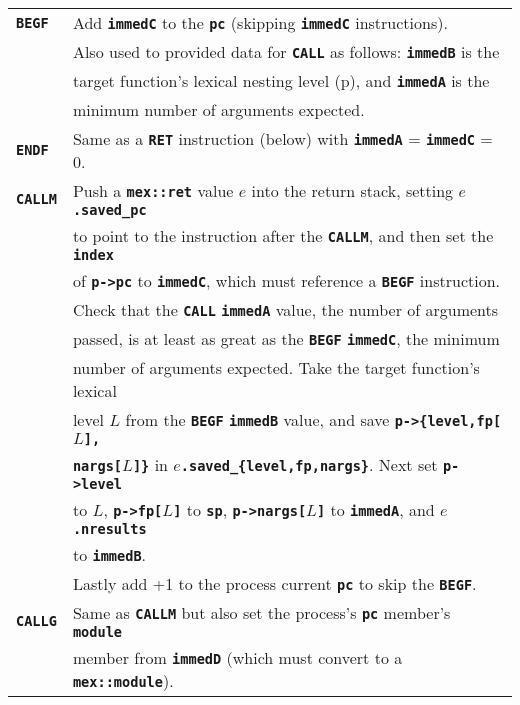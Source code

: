 \documentclass[12pt]{article}
\newcommand{\TT}[1]{{\tt \bfseries #1}}
\newcommand{\pagref}[1]{p\pageref{#1}}
\newlength{\figurewidth}
\newenvironment{boxedfigure}[1][!btp]%
	{\begin{figure*}[#1]
	 \begin{lrbox}{\figurebox}
	 \begin{minipage}{\figurewidth}

	 \vspace*{1ex}}%
	{
	 \vspace*{1ex}

	 \end{minipage}
	 \end{lrbox}

	 \centering
	 \fbox{\hspace*{0.1in}\usebox{\figurebox}\hspace*{0.1in}}
	 \end{figure*}}
\begin{document}
\pagebreak

\begin{boxedfigure}

\begin{center}
\begin{tabular}{|l|l|}
\hline
\TT{BEGF}
    & Add \TT{immedC} to the \TT{pc} (skipping \TT{immedC} instructions).
    \\[0.5ex]
    & Also used to provided data for \TT{CALL} as follows: \TT{immedB} is the \\
    & target function's lexical nesting level (\pagref{LEXICAL-NESTING-LEVEL}),
      and \TT{immedA} is the \\
    & minimum number of arguments expected.
\\\hline
\TT{ENDF}
    & Same as a \TT{RET} instruction (below) with
      \TT{immedA} = \TT{immedC} = 0. 
\\\hline
\TT{CALLM}
    & Push a \TT{mex::ret} value $e$ into the return stack, setting
      \TT{$e$.saved\_pc} \\
    & to point to the instruction after the \TT{CALLM}, and then
      set the \TT{index} \\
    & of \TT{p->pc} to \TT{immedC}, which must reference a
      \TT{BEGF} instruction.
    \\[0.5ex]
    & Check that the \TT{CALL} \TT{immedA} value, the number of arguments \\
    & passed, is at least as great as the \TT{BEGF}
      \TT{immedC}, the minimum \\
    & number of arguments expected.  Take the target 
      function's lexical \\
    & level $L$ from the \TT{BEGF} \TT{immedB} value, and save
      \TT{p->\{level,fp[$L$],} \\
    & \TT{nargs[$L$]\}} in \TT{$e$.saved\_\{level,fp,nargs\}}.
       Next set \TT{p->level} \\
    & to $L$, \TT{p->fp[$L$]} to \TT{sp}, \TT{p->nargs[$L$]} to \TT{immedA},
      and \TT{$e$.nresults} \\
    & to \TT{immedB}.
    \\[0.5ex]
    & Lastly add +1 to the process current \TT{pc} to skip the \TT{BEGF}.
\\\hline
\TT{CALLG}
    & Same as \TT{CALLM} but also set the process's \TT{pc} member's 
                                                           \TT{module} \\
    & member from \TT{immedD} (which must convert to a \TT{mex::module}).

\end{tabular}
\end{center}
\end{boxedfigure}
\end{document}
